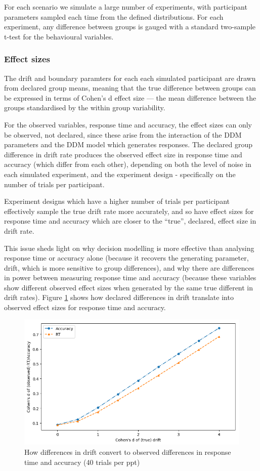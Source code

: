 \documentclass[floatsintext,doc]{apa6}
\theoremstyle{definition}
\theoremstyle{definition}
\theoremstyle{definition}
\theoremstyle{remark}
\begin{document}
For each scenario we simulate a large number of experiments, with
participant parameters sampled each time from the defined distributions.
For each experiment, any difference between groups is gauged with a
standard two-sample t-test for the behavioural variables.

\subsubsection{Effect sizes}\label{effect-sizes}

The drift and boundary paramters for each each simulated participant are
drawn from declared group means, meaning that the true difference
between groups can be expressed in terms of Cohen's d effect size ---
the mean difference between the groups standardised by the within group
variability.

For the observed variables, response time and accuracy, the effect sizes
can only be observed, not declared, since these arise from the
interaction of the DDM parameters and the DDM model which generates
responses. The declared group difference in drift rate produces the
observed effect size in response time and accuracy (which differ from
each other), depending on both the level of noise in each simulated
experiment, and the experiment design - specifically on the number of
trials per participant.

Experiment designs which have a higher number of trials per participant
effectively sample the true drift rate more accurately, and so have
effect sizes for response time and accuracy which are closer to the
\enquote{true}, declared, effect size in drift rate.

This issue sheds light on why decision modelling is more effective than
analysing response time or accuracy alone (because it recovers the
generating parameter, drift, which is more sensitive to group
differences), and why there are differences in power between measuring
response time and accuracy (because these variables show different
observed effect sizes when generated by the same true different in drift
rates). Figure \ref{fig:effectsizes} shows how declared differences in
drift translate into observed effect sizes for response time and
accuracy.

\begin{figure}

{\centering \includegraphics[width=0.68\linewidth]{figs/effectsizetranslation} 

}

\caption{How differences in drift convert to observed differences in response time and accuracy (40 trials per ppt)}\label{fig:effectsizes}
\end{figure}
\end{document}
